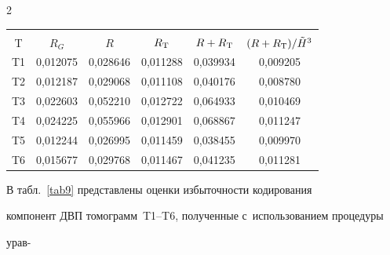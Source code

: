 \begin{multicols}{2}
\begin{table}[b]
\begin{center}

\label{tab10}

\vspace{2ex}



\tabcolsep=10pt

\begin{tabular}{|c|c|c|c|c|c|}

\hline

&&&&&\\[-9pt]

T & $R_G$ &  $R$ & $R_{\rm T}$ & $R+R_{\rm T}$ & $(R+R_{\rm T})/\tilde{H}^3$\\

\hline

T1 & 0,012075 & 0,028646 & 0,011288 & 0,039934 & 0,009205\\


T2 & 0,012187 & 0,029068 & 0,011108 & 0,040176 & 0,008780\\


T3 & 0,022603 & 0,052210 & 0,012722 & 0,064933 & 0,010469\\


T4 & 0,024225 & 0,055966 & 0,012901 & 0,068867 & 0,011247\\


T5 & 0,012244 & 0,026995 & 0,011459 & 0,038455 & 0,009970\\


T6 & 0,015677 & 0,029768 & 0,011467 & 0,041235 & 0,011281\\

\hline

\end{tabular}

\end{center}

\end{table}



В табл.~\ref{tab9} представлены оценки избыточности кодирования 

компонент ДВП томограмм~T1--T6, полученные с~использованием процедуры 

урав-\linebreak\vspace*{-12pt}




\end{multicols}
